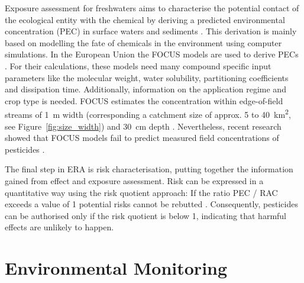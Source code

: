 Exposure assessment for freshwaters aims to characterise the potential contact of the ecological entity with the chemical by deriving a predicted environmental concentration (PEC) in surface waters and sediments \citep{newman_fundamentals_2015}. 
This derivation is mainly based on modelling the fate of chemicals in the environment using computer simulations. 
In the European Union the FOCUS models are used to derive PECs \citep{focus_focus_2001, efsa_guidance_2013}.
For their calculations, these models need many compound specific input parameters like the molecular weight, water solubility, partitioning coefficients and dissipation time. 
Additionally, information on the application regime and crop type is needed. 
FOCUS estimates the concentration within edge-of-field streams of 1~m width (corresponding a catchment size of approx. 5 to 40~km\textsuperscript{2}, see Figure~\ref{fig:size_width}) and 30~cm depth \citep{erlacher_regulation_2011}. 
Nevertheless, recent research showed that FOCUS models fail to predict measured field concentrations of pesticides \citep{knabel_regulatory_2012, knabel_fungicide_2014}. 

The final step in ERA is risk characterisation, putting together the information gained from effect and exposure assessment. 
Risk can be expressed in a quantitative way using the risk quotient approach: If the ratio PEC / RAC exceeds a value of 1 potential risks cannot be rebutted \citep{efsa_guidance_2013, suter_ecological_2007,  solomon_probabilistic_2000}. 
Consequently, pesticides can be authorised only if the risk quotient is below 1, indicating that harmful effects are unlikely to happen.



\section{Environmental Monitoring}

